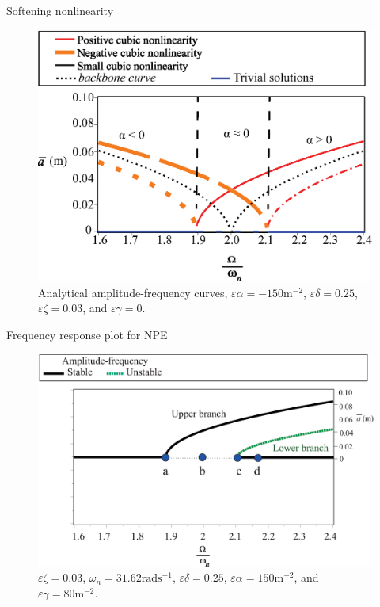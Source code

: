 \documentclass[LaTeX2e,10pt]{beamer}
\begin{document}
\begin{frame}{Softening nonlinearity}
	\begin{figure}[h!]
		\centering
		\includegraphics[width=0.9\linewidth]{Images/4/AmplitudeFrequencyNonlinear1-3.eps}
		\caption{Analytical amplitude-frequency curves, \colorbox[rgb]{1,0.41,0.13}{$\varepsilon \alpha = -150 \mathrm{m^{-2}}$}, $\varepsilon \delta = 0.25$, $\varepsilon \zeta = 0.03$, and $\varepsilon \gamma = 0$.}
	\end{figure}
\end{frame}
\begin{frame}{Frequency response plot for NPE}
	\begin{figure}[h!]
		\centering
		\includegraphics[width=\linewidth]{Images/4/NonlinEpsilonTransfer1-4.eps}
		\caption{$\varepsilon \zeta = 0.03$, $\omega_n = 31.62\mathrm{rad s^{-1}}$, $\varepsilon \delta = 0.25$, $\varepsilon \alpha = 150 \mathrm{m^{-2}}$, and $\varepsilon \gamma = 80 \mathrm{m^{-2}}$.}
	\end{figure}
\end{frame}
\end{document}
